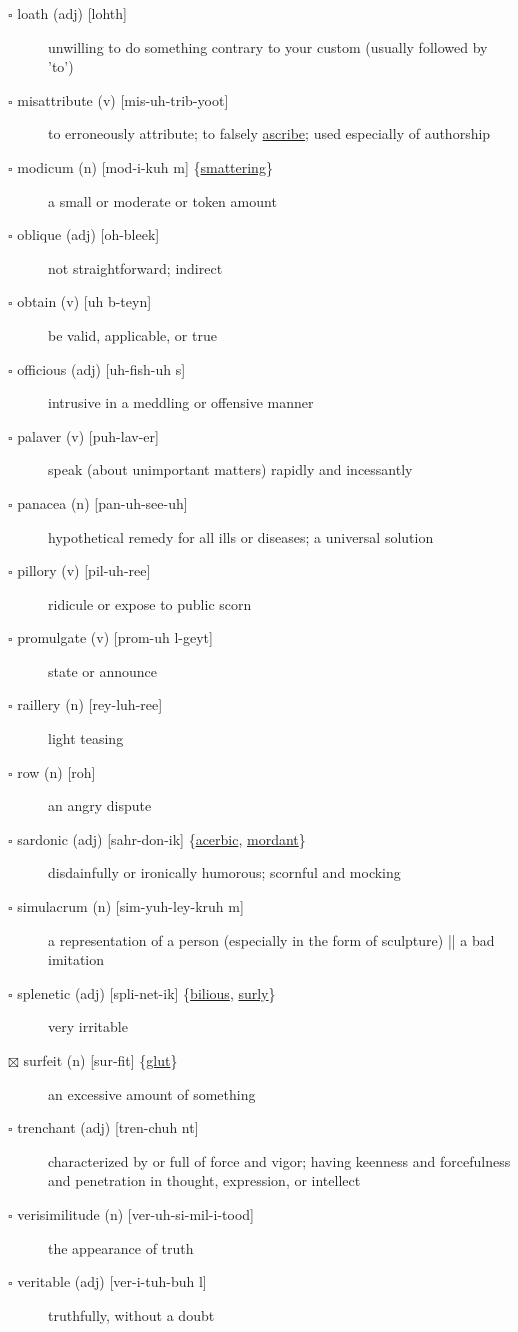 \documentclass[11pt]{article}
\begin{document}
\begin{description}
\item[{$\square$ loath (adj) [lohth]}] unwilling to do something contrary to your custom (usually followed by 'to')
\item[{$\square$ misattribute (v) [mis-uh-trib-yoot]}] to erroneously attribute; to falsely \hyperref[org302821a]{ascribe}; used especially of authorship
\item[{$\square$ \label{org520b8ae}modicum (n) [mod-i-kuh m] \{\hyperref[org8c431ea]{smattering}\}}] a small or moderate or token amount
\item[{$\square$ oblique (adj) [oh-bleek]}] not straightforward; indirect
\item[{$\square$ obtain (v) [uh b-teyn]}] be valid, applicable, or true
\item[{$\square$ officious (adj) [uh-fish-uh s]}] intrusive in a meddling or offensive manner
\item[{$\square$ palaver (v) [puh-lav-er]}] speak (about unimportant matters) rapidly and incessantly
\item[{$\square$ panacea (n) [pan-uh-see-uh]}] hypothetical remedy for all ills or diseases; a universal solution
\item[{$\square$ pillory (v) [pil-uh-ree]}] ridicule or expose to public scorn
\item[{$\square$ promulgate (v) [prom-uh l-geyt]}] state or announce
\item[{$\square$ raillery (n) [rey-luh-ree]}] light teasing
\item[{$\square$ row (n) [roh]}] an angry dispute
\item[{$\square$ \label{org465533c}sardonic (adj) [sahr-don-ik] \{\hyperref[orgbcb2ff6]{acerbic}, \hyperref[org20916b3]{mordant}\}}] disdainfully or ironically humorous; scornful and mocking
\item[{$\square$ simulacrum (n) [sim-yuh-ley-kruh m]}] a representation of a person (especially in the form of sculpture) || a bad imitation
\item[{$\square$ \label{org5650bf8}splenetic (adj) [spli-net-ik] \{\hyperref[org702a6c2]{bilious}, \hyperref[orgb7ecd9a]{surly}\}}] very irritable
\item[{$\boxtimes$ \label{org9af0aa5}surfeit (n) [sur-fit] \{\hyperref[org1711d42]{glut}\}}] an excessive amount of something
\item[{$\square$ trenchant (adj) [tren-chuh nt]}] characterized by or full of force and vigor; having keenness and forcefulness and penetration in thought, expression, or intellect
\item[{$\square$ verisimilitude (n) [ver-uh-si-mil-i-tood]}] the appearance of truth
\item[{$\square$ veritable (adj) [ver-i-tuh-buh l]}] truthfully, without a doubt
\end{description}
\end{document}
